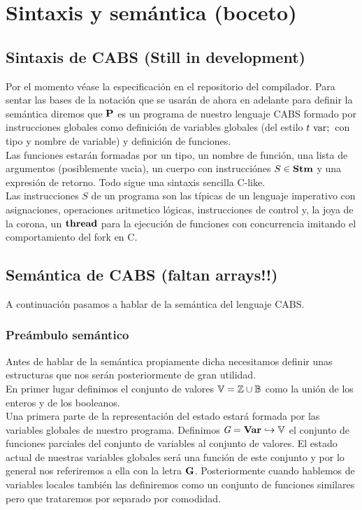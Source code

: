\chapter{Sintaxis y semántica (boceto)}
\section{Sintaxis de CABS (Still in development)}
Por el momento véase la especificación en el repositorio del compilador. Para sentar las bases de la notación que se usarán de ahora en adelante para definir la semántica diremos que $\P$ es un programa de nuestro lenguaje CABS formado por instrucciones globales como definición de variables globales (del estilo $t \var \;$ con tipo y nombre de variable) y definición de funciones.\\

Las funciones estarán formadas por un tipo, un nombre de función, una lista de argumentos (posiblemente vacia), un cuerpo con instrucciónes $S \in \Stm$ y una expresión de retorno. Todo sigue una sintaxis sencilla C-like.\\

Las instrucciones $S$ de un programa son las típicas de un lenguaje imperativo con asignaciones, operaciones aritmetico lógicas, instrucciones de control y, la joya de la corona, un $\thread$ para la ejecución de funciones con concurrencia imitando el comportamiento del fork en C.
\section{Semántica de CABS (faltan arrays!!)}
A continuación pasamos a hablar de la semántica del lenguaje CABS.
\subsection{Preámbulo semántico}
Antes de hablar de la semántica propiamente dicha necesitamos definir unas estructuras que nos serán posteriormente de gran utilidad.\\

En primer lugar definimos el conjunto de valores $\V = \Z \cup \B$ como la unión de los enteros y de los booleanos.\\

Una primera parte de la representación del estado estará formada por las variables globales de nuestro programa. Definimos $\Gs = \Var \hookrightarrow \V$ el conjunto de funciones parciales del conjunto de variables al conjunto de valores. El estado actual de nuestras variables globales será una función de este conjunto y por lo general nos referiremos a ella con la letra $\G$. Posteriormente cuando hablemos de variables locales también las definiremos como un conjunto de funciones similares pero que trataremos por separado por comodidad.\\

